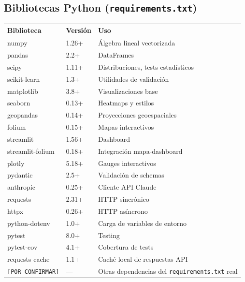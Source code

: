 \documentclass[11pt,a4paper]{article}
\begin{document}
\subsection{Bibliotecas Python (\texttt{requirements.txt})}
\begin{center}
\begin{tabularx}{\textwidth}{L{3.2cm} L{2cm} X}
\toprule
\textbf{Biblioteca} & \textbf{Versión} & \textbf{Uso} \\
\midrule
numpy            & 1.26+ & Álgebra lineal vectorizada \\
pandas           & 2.2+  & DataFrames \\
scipy            & 1.11+ & Distribuciones, tests estadísticos \\
scikit-learn     & 1.3+  & Utilidades de validación \\
matplotlib       & 3.8+  & Visualizaciones base \\
seaborn          & 0.13+ & Heatmaps y estilos \\
geopandas        & 0.14+ & Proyecciones geoespaciales \\
folium           & 0.15+ & Mapas interactivos \\
streamlit        & 1.56+ & Dashboard \\
streamlit-folium & 0.18+ & Integración mapa-dashboard \\
plotly           & 5.18+ & Gauges interactivos \\
pydantic         & 2.5+  & Validación de schemas \\
anthropic        & 0.25+ & Cliente API Claude \\
requests         & 2.31+ & HTTP sincrónico \\
httpx            & 0.26+ & HTTP asíncrono \\
python-dotenv    & 1.0+  & Carga de variables de entorno \\
pytest           & 8.0+  & Testing \\
pytest-cov       & 4.1+  & Cobertura de tests \\
requests-cache   & 1.1+  & Caché local de respuestas API \\
\texttt{[POR CONFIRMAR]} & --- & Otras dependencias del \texttt{requirements.txt} real \\
\bottomrule
\end{tabularx}
\end{center}
\end{document}
